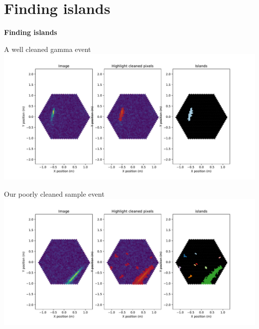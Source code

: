 \section{Finding islands}

\begin{frame}
    \centering
    {\Huge \textbf{Finding islands}}
\end{frame}

\begin{frame}{A well cleaned gamma event}
    \includegraphics[width=\linewidth]{images/islands_single.pdf}
\end{frame}


\begin{frame}{Our poorly cleaned sample event}
    \includegraphics[width=\linewidth]{images/islands.pdf}
\end{frame}

